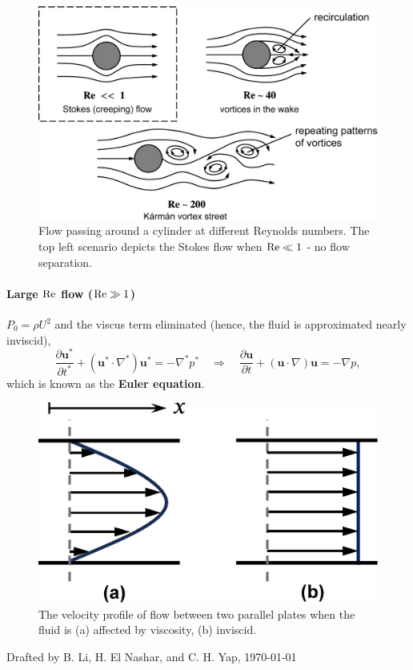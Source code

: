 \documentclass[a4paper]{article}
\begin{document}
\begin{figure}[H]
    \centering
    \includegraphics[width=0.6\linewidth]{img/flow_pass_cylinder.eps}
    \caption{Flow passing around a cylinder at different Reynolds numbers. The top left scenario depicts the Stokes flow when $\rm Re \ll 1$ - no flow separation.}
    \label{fig:flow_around_cylinder}
\end{figure}


\paragraph{Large $\rm Re$ flow ($ \rm Re \gg 1$)} $P_0 = \rho U^2$ and the viscus term eliminated {\color{gray}(hence, the fluid is approximated nearly inviscid)},
\[
    \frac{\partial \mathbf{u^{*}}}{\partial t^{*}} + (\mathbf{u^{*}}\cdot \nabla^{*})\mathbf{u^{*}} = -\nabla^{*} p^{*}
    \quad \Longrightarrow \quad
    \frac{\partial \mathbf{u}}{\partial t} + (\mathbf{u}\cdot \nabla)\mathbf{u} = -\nabla p,
\]
which is known as the \textbf{Euler equation}. 
\begin{figure}[H]
    \centering
    \includegraphics[width=.3\textwidth]{img/viscid_inviscid_profs.eps}
    \caption {The velocity profile of flow between two parallel plates when the fluid is (a) affected by viscosity, (b) inviscid.}
\end{figure}

\vfill
{\small \color{gray}Drafted by B. Li, H. El Nashar, and C. H. Yap,  \today}
% 
\end{document}
